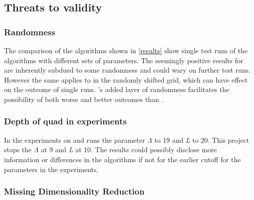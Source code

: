 \subsection{Threats to validity}

\subsubsection{Randomness}
\label{disc/threats/randomness}
The comparison of the algorithms shown in \ref{results} show single test runs of the algorithms with different sets of parameters. The seemingly positive results for \qsr{} are inherently subdued to some randomness and could wary on further test runs. However the same applies to \qs{} in the randomly shifted grid, which can have effect on the outcome of single runs. \qsr{}'s added layer of randomness facilitates the possibility of both worse and better outcomes than \qs{}.

\subsubsection{Depth of quad in experiments}
In \cite{wagner17} the experiments on \qs{} and \grid{} runs the parameter $\Lambda$ to 19 and \textit{L} to 20. This project stops the $\Lambda$ at 9 and \textit{L} at 10. The results could possibly disclose more information or differences in the algorithms if not for the earlier cutoff for the parameters in the experiments.

\subsubsection{Missing Dimensionality Reduction}
